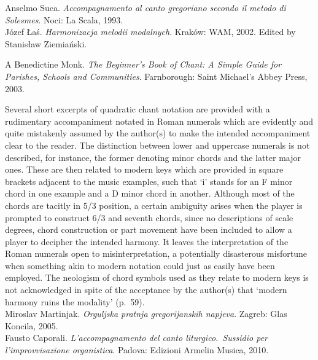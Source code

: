     \parindent=0pt
    \hangindent=0pt
  \covid{}Anselmo Suca. \emph{Accompagnamento al canto gregoriano secondo il metodo di Solesmes}. Noci:  La Scala, 1993. \\

    \parindent=0pt
    \hangindent=0pt
  \covid{}Józef \L{}a\'{s}. \emph{Harmonizacja melodii modalnych}. Kraków:  WAM, 2002. Edited by Stanis\l{}aw Ziemia\'{n}ski. \\\pagebreak{}

    \parindent=0pt
    \hangindent=0pt
  A Benedictine Monk. \emph{The Beginner's Book of Chant: A Simple Guide for Parishes, Schools and Communities}. Farnborough:  Saint Michael's Abbey Press, 2003.

     \parindent=20pt
     \hangindent=20pt
     Several short excerpts of quadratic chant notation are provided with a rudimentary accompaniment notated in Roman numerals which are evidently and quite mistakenly assumed by the author(s) to make the intended accompaniment clear to the reader. The distinction between lower and uppercase numerals is not described, for instance, the former denoting minor chords and the latter major ones. These are then related to modern keys which are provided in square brackets adjacent to the music examples, such that `i' stands for an F\kern 1pt\sharp{} minor chord in one example and a D minor chord in another. Although most of the chords are tacitly in 5/3 position, a certain ambiguity arises when the player is prompted to construct 6/3 and seventh chords, since no descriptions of scale degrees, chord construction or part movement have been included to allow a player to decipher the intended harmony. It leaves the interpretation of the Roman numerals open to misinterpretation, a potentially disasterous misfortune when something akin to modern notation could just as easily have been employed. The neologism of chord symbols used as they relate to modern keys is not acknowledged in spite of the acceptance by the author(s) that `modern harmony ruins the modality' (p.~59).\\

    \parindent=0pt
    \hangindent=0pt
  \covid{}Miroslav Martinjak. \emph{Orguljska pratnja gregorijanskih napjeva}. Zagreb:  Glas Koncila, 2005. \\

    \parindent=0pt
    \hangindent=0pt
  \covid{}Fausto Caporali. \emph{L'accompagnamento del canto liturgico.\ Sussidio per l'improvvisazione organistica}. Padova:  Edizioni Armelin Musica, 2010.

